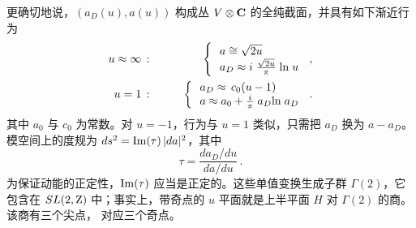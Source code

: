 更确切地说，$(a_D(u), a(u))$ 构成丛 $V\otimes {\bf C}$ 的全纯截面，并具有如下渐近行为
\begin{eqnarray}
u\approx \infty\,:&\qquad& \left\{\, \begin{array}{l}
a \cong \sqrt{2u}\,  \\
a_D \approx i\;\frac{\sqrt{2u}}{\pi}\;{\rm ln}\; u
\end{array} \right. \,, \nonumber\\
u=1\,:&\qquad& \left\{\, \begin{array}{l}
a_D \approx \,c_0 (u-1) \\
a \approx a_0 + \frac{i}{\pi} \; a_{D}{\rm ln}\; a_{D}
\end{array} \right. \,.\nonumber
\end{eqnarray}
其中 $a_0$ 与 $c_0$ 为常数。对 $u=-1$，行为与 $u=1$ 类似，只需把 $a_D$ 换为 $a-a_D$。
模空间上的度规为 $ds^2={\rm Im}(\tau)\,|da|^2$，其中
\begin{equation}
\tau =\frac{da_D/du}{da / du}\,.
\label{tau-metric}
\end{equation}
为保证动能的正定性，${\rm Im}(\tau)$ 应当是正定的。这些单值变换生成子群 $\Gamma(2)$，它包含在 $SL(2,{\rm Z})$ 中；事实上，带奇点的 $u$ 平面就是上半平面 $H$ 对 $\Gamma(2)$ 的商。该商有三个尖点，
对应三个奇点。



